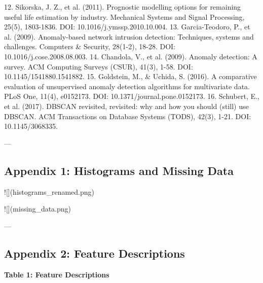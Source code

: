 \documentclass{sigkddExp}
\begin{document}
12. Sikorska, J. Z., et al. (2011). Prognostic modelling options for remaining useful life estimation by industry. Mechanical Systems and Signal Processing, 25(5), 1803-1836. DOI: 10.1016/j.ymssp.2010.10.004.
13. Garcia-Teodoro, P., et al. (2009). Anomaly-based network intrusion detection: Techniques, systems and challenges. Computers & Security, 28(1-2), 18-28. DOI: 10.1016/j.cose.2008.08.003.
14. Chandola, V., et al. (2009). Anomaly detection: A survey. ACM Computing Surveys (CSUR), 41(3), 1-58. DOI: 10.1145/1541880.1541882.
15. Goldstein, M., & Uchida, S. (2016). A comparative evaluation of unsupervised anomaly detection algorithms for multivariate data. PLoS One, 11(4), e0152173. DOI: 10.1371/journal.pone.0152173.
16. Schubert, E., et al. (2017). DBSCAN revisited, revisited: why and how you should (still) use DBSCAN. ACM Transactions on Database Systems (TODS), 42(3), 1-21. DOI: 10.1145/3068335.


---



\subsection{Appendix 1: Histograms and Missing Data}

![](histograms_renamed.png) 

![](missing_data.png)

---

\subsection{Appendix 2: Feature Descriptions}

\textbf{Table 1: Feature Descriptions}
\end{document}
